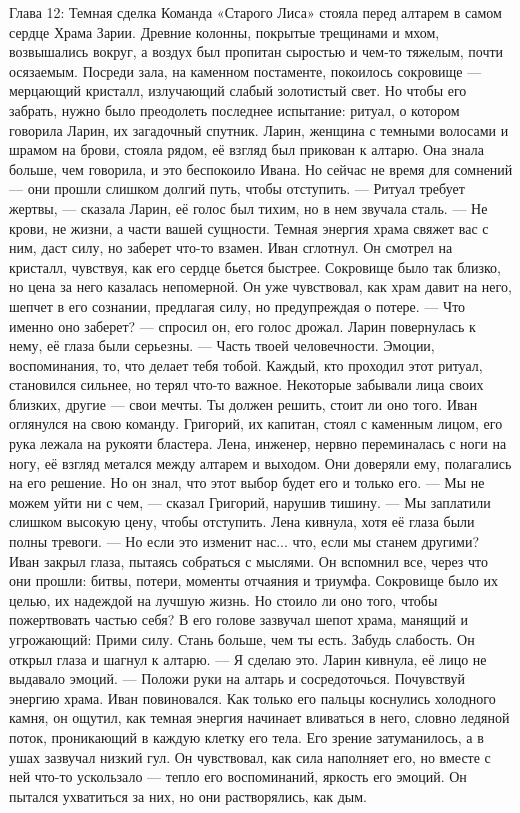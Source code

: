 \documentclass[12pt,a4paper]{book}
\begin{document}
Глава 12: Темная сделка
Команда «Старого Лиса» стояла перед алтарем в самом сердце Храма Зарии. Древние колонны, покрытые трещинами и мхом, возвышались вокруг, а воздух был пропитан сыростью и чем-то тяжелым, почти осязаемым. Посреди зала, на каменном постаменте, покоилось сокровище — мерцающий кристалл, излучающий слабый золотистый свет. Но чтобы его забрать, нужно было преодолеть последнее испытание: ритуал, о котором говорила Ларин, их загадочный спутник.
Ларин, женщина с темными волосами и шрамом на брови, стояла рядом, её взгляд был прикован к алтарю. Она знала больше, чем говорила, и это беспокоило Ивана. Но сейчас не время для сомнений — они прошли слишком долгий путь, чтобы отступить.
— Ритуал требует жертвы, — сказала Ларин, её голос был тихим, но в нем звучала сталь. — Не крови, не жизни, а части вашей сущности. Темная энергия храма свяжет вас с ним, даст силу, но заберет что-то взамен.
Иван сглотнул. Он смотрел на кристалл, чувствуя, как его сердце бьется быстрее. Сокровище было так близко, но цена за него казалась непомерной. Он уже чувствовал, как храм давит на него, шепчет в его сознании, предлагая силу, но предупреждая о потере.
— Что именно оно заберет? — спросил он, его голос дрожал.
Ларин повернулась к нему, её глаза были серьезны. — Часть твоей человечности. Эмоции, воспоминания, то, что делает тебя тобой. Каждый, кто проходил этот ритуал, становился сильнее, но терял что-то важное. Некоторые забывали лица своих близких, другие — свои мечты. Ты должен решить, стоит ли оно того.
Иван оглянулся на свою команду. Григорий, их капитан, стоял с каменным лицом, его рука лежала на рукояти бластера. Лена, инженер, нервно переминалась с ноги на ногу, её взгляд метался между алтарем и выходом. Они доверяли ему, полагались на его решение. Но он знал, что этот выбор будет его и только его.
— Мы не можем уйти ни с чем, — сказал Григорий, нарушив тишину. — Мы заплатили слишком высокую цену, чтобы отступить.
Лена кивнула, хотя её глаза были полны тревоги. — Но если это изменит нас... что, если мы станем другими?
Иван закрыл глаза, пытаясь собраться с мыслями. Он вспомнил все, через что они прошли: битвы, потери, моменты отчаяния и триумфа. Сокровище было их целью, их надеждой на лучшую жизнь. Но стоило ли оно того, чтобы пожертвовать частью себя?
В его голове зазвучал шепот храма, манящий и угрожающий: Прими силу. Стань больше, чем ты есть. Забудь слабость.
Он открыл глаза и шагнул к алтарю. — Я сделаю это.
Ларин кивнула, её лицо не выдавало эмоций. — Положи руки на алтарь и сосредоточься. Почувствуй энергию храма.
Иван повиновался. Как только его пальцы коснулись холодного камня, он ощутил, как темная энергия начинает вливаться в него, словно ледяной поток, проникающий в каждую клетку его тела. Его зрение затуманилось, а в ушах зазвучал низкий гул. Он чувствовал, как сила наполняет его, но вместе с ней что-то ускользало — тепло его воспоминаний, яркость его эмоций. Он пытался ухватиться за них, но они растворялись, как дым.
\end{document}
